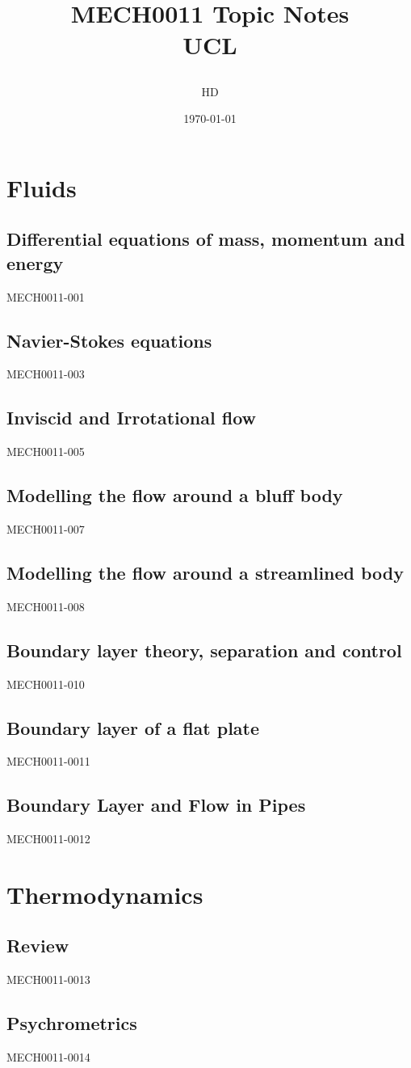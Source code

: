 \documentclass[12pt,a4paper, twoside]{report}
\begin{document}
\title{
  {MECH0011 Topic Notes}\\
  {\large UCL}
  \author{HD}
  \date{\today}
}
\maketitle
\tableofcontents
\part{Fluids}
\chapter{Differential equations of mass, momentum and energy}
{MECH0011-001}
\chapter{Navier-Stokes equations}
{MECH0011-003}
\chapter{Inviscid and Irrotational flow}
{MECH0011-005}
\chapter{Modelling the flow around a bluff body}
{MECH0011-007}
\chapter{Modelling the flow around a streamlined body}
{MECH0011-008}
\chapter{Boundary layer theory, separation and control}
{MECH0011-010}
\chapter{Boundary layer of a flat plate}
{MECH0011-0011}
\chapter{Boundary Layer and Flow in Pipes}
{MECH0011-0012}
\part{Thermodynamics}
\chapter{Review}
{MECH0011-0013}
\chapter{Psychrometrics}
{MECH0011-0014}
\end{document}
